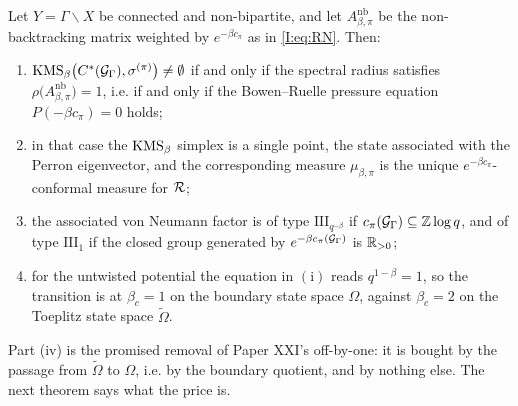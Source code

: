 \begin{theorem}\label{I:thm:kms}
Let $Y=\Gamma\backslash X$ be connected and non-bipartite, and let
$A^{\mathrm{nb}}_{\beta,\pi}$ be the non-backtracking matrix weighted by
$e^{-\beta c_\pi}$ as in \eqref{I:eq:RN}. Then:
\begin{enumerate}
\item[(i)] $\mathrm{KMS}_\beta\bigl(C^*(\mathcal{G}_\Gamma),\sigma^{(\pi)}\bigr)\neq\emptyset$ if and only
if the spectral radius satisfies $\rho\bigl(A^{\mathrm{nb}}_{\beta,\pi}\bigr)=1$, i.e.
if and only if the Bowen--Ruelle pressure equation $P(-\beta c_\pi)=0$ holds;
\item[(ii)] in that case the $\mathrm{KMS}_\beta$ simplex is a single point, the state
associated with the Perron eigenvector, and the corresponding measure $\mu_{\beta,\pi}$
is the unique $e^{-\beta c_\pi}$-conformal measure for $\mathcal{R}$;
\item[(iii)] the associated von Neumann factor is of type $\mathrm{III}_{q^{-\beta}}$ if
$c_\pi(\mathcal{G}_\Gamma)\subseteq\mathbb{Z}\log q$, and of type $\mathrm{III}_1$ if the closed group
generated by $e^{-\beta c_\pi(\mathcal{G}_\Gamma)}$ is $\mathbb{R}_{>0}$;
\item[(iv)] for the untwisted potential the equation in $(\mathrm{i})$ reads
$q^{1-\beta}=1$, so the transition is at $\beta_c=1$ on the boundary state space
$\Omega$, against $\beta_c=2$ on the Toeplitz state space $\widetilde\Omega$.
\end{enumerate}
\end{theorem}

Part (iv) is the promised removal of Paper XXI's off-by-one: it is bought by the passage
from $\widetilde\Omega$ to $\Omega$, i.e. by the boundary quotient, and by nothing else.
The next theorem says what the price is.

